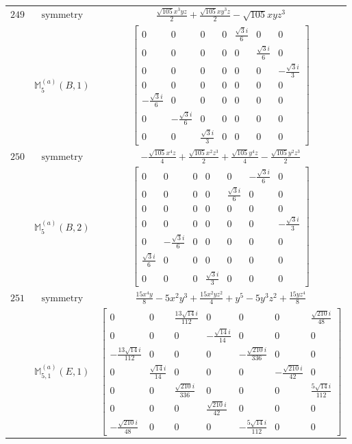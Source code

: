 \documentclass[fleqn,8pt,landscape]{jsarticle}
\begin{document}
\begin{longtable}{ccc}
$ 249 $ & $ \text{symmetry} $ & $ \frac{\sqrt{105} x^{3} y z}{2} + \frac{\sqrt{105} x y^{3} z}{2} - \sqrt{105} x y z^{3} $ \\
$  $ & $ \mathbb{M}_{5}^{(a)}(B,1) $ & $ \begin{bmatrix} 0 & 0 & 0 & 0 & \frac{\sqrt{3} i}{6} & 0 & 0 \\ 0 & 0 & 0 & 0 & 0 & \frac{\sqrt{3} i}{6} & 0 \\ 0 & 0 & 0 & 0 & 0 & 0 & - \frac{\sqrt{3} i}{3} \\ 0 & 0 & 0 & 0 & 0 & 0 & 0 \\ - \frac{\sqrt{3} i}{6} & 0 & 0 & 0 & 0 & 0 & 0 \\ 0 & - \frac{\sqrt{3} i}{6} & 0 & 0 & 0 & 0 & 0 \\ 0 & 0 & \frac{\sqrt{3} i}{3} & 0 & 0 & 0 & 0 \end{bmatrix} $ \\ \hline
$ 250 $ & $ \text{symmetry} $ & $ - \frac{\sqrt{105} x^{4} z}{4} + \frac{\sqrt{105} x^{2} z^{3}}{2} + \frac{\sqrt{105} y^{4} z}{4} - \frac{\sqrt{105} y^{2} z^{3}}{2} $ \\
$  $ & $ \mathbb{M}_{5}^{(a)}(B,2) $ & $ \begin{bmatrix} 0 & 0 & 0 & 0 & 0 & - \frac{\sqrt{3} i}{6} & 0 \\ 0 & 0 & 0 & 0 & \frac{\sqrt{3} i}{6} & 0 & 0 \\ 0 & 0 & 0 & 0 & 0 & 0 & 0 \\ 0 & 0 & 0 & 0 & 0 & 0 & - \frac{\sqrt{3} i}{3} \\ 0 & - \frac{\sqrt{3} i}{6} & 0 & 0 & 0 & 0 & 0 \\ \frac{\sqrt{3} i}{6} & 0 & 0 & 0 & 0 & 0 & 0 \\ 0 & 0 & 0 & \frac{\sqrt{3} i}{3} & 0 & 0 & 0 \end{bmatrix} $ \\ \hline
$ 251 $ & $ \text{symmetry} $ & $ \frac{15 x^{4} y}{8} - 5 x^{2} y^{3} + \frac{15 x^{2} y z^{2}}{4} + y^{5} - 5 y^{3} z^{2} + \frac{15 y z^{4}}{8} $ \\
$  $ & $ \mathbb{M}_{5,1}^{(a)}(E,1) $ & $ \begin{bmatrix} 0 & 0 & \frac{13 \sqrt{14} i}{112} & 0 & 0 & 0 & \frac{\sqrt{210} i}{48} \\ 0 & 0 & 0 & - \frac{\sqrt{14} i}{14} & 0 & 0 & 0 \\ - \frac{13 \sqrt{14} i}{112} & 0 & 0 & 0 & - \frac{\sqrt{210} i}{336} & 0 & 0 \\ 0 & \frac{\sqrt{14} i}{14} & 0 & 0 & 0 & - \frac{\sqrt{210} i}{42} & 0 \\ 0 & 0 & \frac{\sqrt{210} i}{336} & 0 & 0 & 0 & \frac{5 \sqrt{14} i}{112} \\ 0 & 0 & 0 & \frac{\sqrt{210} i}{42} & 0 & 0 & 0 \\ - \frac{\sqrt{210} i}{48} & 0 & 0 & 0 & - \frac{5 \sqrt{14} i}{112} & 0 & 0 \end{bmatrix} $ \\ \hline

\end{longtable}
\end{document}
